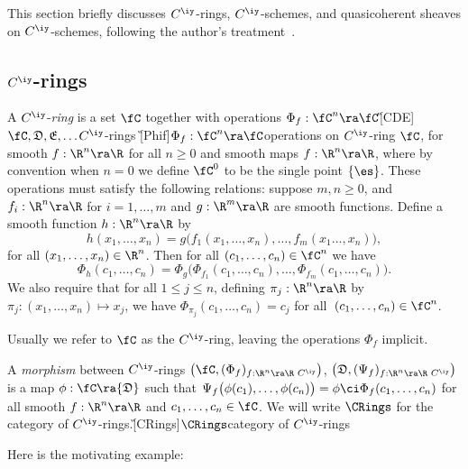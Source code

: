 \documentclass{article}
\begin{document}
This section briefly discusses $C^\iy$-rings, $C^\iy$-schemes, and
quasicoherent sheaves on $C^\iy$-schemes, following the author's
treatment~\cite[\S 2--\S 6]{Joyc4}.

\subsection{$C^\iy$-rings}
\label{ds21}

\begin{dfn} A $C^\iy$-{\it ring\/} is a set $\fC$ together with
operations $\Phi_f:\fC^n\ra\fC$\G[CDE]{$\fC,{\mathfrak D},{\mathfrak
E},\ldots$}{$C^\iy$-rings} \G[Phif]{$\Phi_f:\fC^n\ra\fC$}{operations
on $C^\iy$-ring $\fC$, for smooth $f:\R^n\ra\R$} for all $n\ge 0$
and smooth maps $f:\R^n\ra\R$, where by convention when $n=0$ we
define $\fC^0$ to be the single point $\{\es\}$. These operations
must satisfy the following relations: suppose $m,n\ge 0$, and
$f_i:\R^n\ra\R$ for $i=1,\ldots,m$ and $g:\R^m\ra\R$ are smooth
functions. Define a smooth function $h:\R^n\ra\R$ by
\begin{equation*}
h(x_1,\ldots,x_n)=g\bigl(f_1(x_1,\ldots,x_n),\ldots,f_m(x_1
\ldots,x_n)\bigr),
\end{equation*}
for all $(x_1,\ldots,x_n)\in\R^n$. Then for all
$(c_1,\ldots,c_n)\in\fC^n$ we have
\begin{equation*}
\Phi_h(c_1,\ldots,c_n)=\Phi_g\bigl(\Phi_{f_1}(c_1,\ldots,c_n),
\ldots,\Phi_{f_m}(c_1,\ldots,c_n)\bigr).
\end{equation*}
We also require that for all $1\le j\le n$, defining
$\pi_j:\R^n\ra\R$ by $\pi_j:(x_1,\ldots,x_n)\mapsto x_j$, we have
$\Phi_{\pi_j}(c_1,\ldots,c_n)=c_j$ for
all~$(c_1,\ldots,c_n)\in\fC^n$.

Usually we refer to $\fC$ as the $C^\iy$-ring, leaving the
operations $\Phi_f$ implicit.

A {\it morphism\/} between $C^\iy$-rings $\bigl(\fC,(\Phi_f)_{
f:\R^n\ra\R\,\,C^\iy}\bigr)$, $\bigl({\mathfrak
D},(\Psi_f)_{f:\R^n\ra\R\,\,C^\iy}\bigr)$ is a map
$\phi:\fC\ra{\mathfrak D}$ such that $\Psi_f\bigl(\phi
(c_1),\ldots,\phi(c_n)\bigr)=\phi\ci\Phi_f(c_1,\ldots,c_n)$ for all
smooth $f:\R^n\ra\R$ and $c_1,\ldots,c_n\in\fC$. We will write
$\CRings$ for the category of
$C^\iy$-rings.\G[CRings]{$\CRings$}{category of $C^\iy$-rings}
\label{ds2def1}
\end{dfn}

Here is the motivating example:
\end{document}
